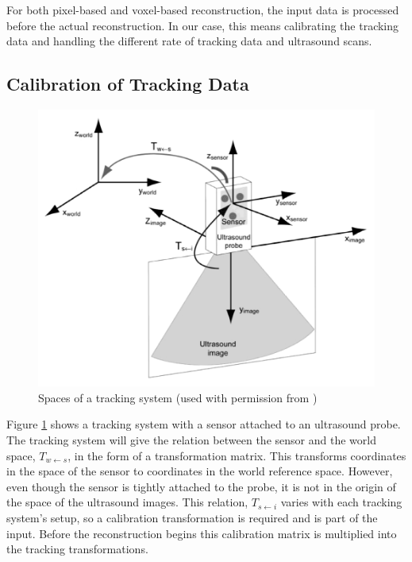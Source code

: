For both pixel-based and voxel-based reconstruction, the input data is processed before the actual reconstruction. In our case, this means calibrating the tracking data and handling the different rate of tracking data and ultrasound scans.

\subsection{Calibration of Tracking Data}

	\begin{figure}[h]
	\centering
	\includegraphics[width=\textwidth]{graphics/tracking_spaces.png}
	\caption[Spaces of a tracking system]{Spaces of a tracking system (used with permission from \cite{mercier2005})}
	\label{fig:tracking_spaces}
	\end{figure}

	Figure \ref{fig:tracking_spaces} shows a tracking system with a sensor attached to an ultrasound probe. The tracking system will give the relation between the sensor and the world space, $T_{w \leftarrow s}$, in the form of a transformation matrix. This transforms coordinates in the space of the sensor to coordinates in the world reference space. However, even though the sensor is tightly attached to the probe, it is not in the origin of the space of the ultrasound images. This relation, $T_{s \leftarrow i}$ varies with each tracking system's setup, so a calibration transformation is required and is part of the input. Before the reconstruction begins this calibration matrix is multiplied into the tracking transformations.

